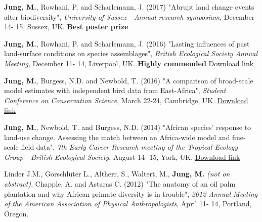 \documentclass[12pt,a4paper,serif]{moderncv}        %
\begin{document}
\begin{bibenum}
    
    \item \textbf{Jung, M.}, Rowhani, P. and Scharlemann, J. (2017) "Abrupt land change events alter biodiversity", \emph{University of Sussex - Annual research symposium}, December 14- 15, Sussex, UK. \textbf{Best poster prize}

    \item \textbf{Jung, M.}, Rowhani, P. and Scharlemann, J. (2016) "Lasting influences of past land-surface conditions on species assemblages", \emph{British Ecological Society Annual Meeting}, December 11- 14, Liverpool, UK. \textbf{Highly commended} \href{https://figshare.com/articles/Lasting_influences_of_past_land-surface_conditions_on_species_assemblages/7155029}{\underline{Download link}}

    \item \textbf{Jung, M.}, Burgess, N.D. and Newbold, T. (2016) "A comparison of broad-scale model estimates with independent bird data from East-Africa", \emph{Student Conference on Conservation Science}, March 22-24, Cambridge, UK. \href{https://figshare.com/articles/A_comparison_of_broad-scale_model_estimates_with_independent_bird_data_from_East-Africa/4231379}{\underline{Download link}}

    \item \textbf{Jung, M.}, Newbold, T. and Burgess, N.D. (2014) "African species' response to land-use change. Assessing the match between an Africa-wide model and fine-scale field data", \emph{7th Early Career Research meeting of the Tropical Ecology Group - British Ecological Society}, August 14- 15, York, UK. \href{https://figshare.com/articles/African_species_response_to_land_use_change_Assessing_the_match_between_an_Africa_wide_model_and_fine_scale_field_data/1613887}{\underline{Download link}}

    \item Linder J.M., Gorschl\"{u}ter L., Altherr, S., Waltert, M., \textbf{Jung, M.} {\small \emph{(not on abstract)}}, Chapple, A. and Astaras C. (2012) "The anatomy of an oil palm plantation and why African primate diversity is in trouble", \emph{2012 Annual Meeting of the American Association of Physical Anthropologists}, April 11- 14, Portland, Oregon.

\end{bibenum}

\vspace{8pt}

\end{document}
